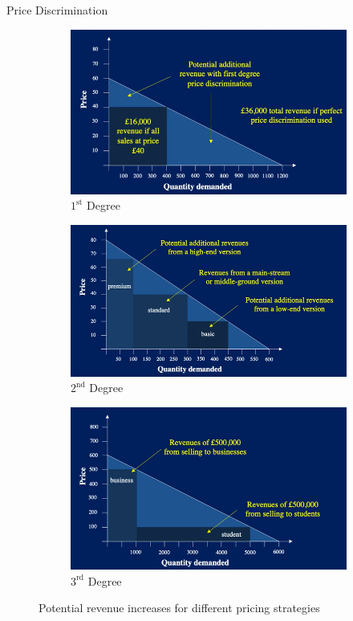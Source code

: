 \documentclass[11pt,a4paper]{article}
\begin{document}
\begin{definition}{Price Discrimination}
  \begin{figure}[ht!]
    \centering
    \begin{subfigure}[b]{.3\textwidth}
         \centering
         \includegraphics[width=\textwidth]{personalisedPricing.PNG}
         \caption{$1^\text{st}$ Degree}
    \end{subfigure}
    \begin{subfigure}[b]{.3\textwidth}
        \centering
        \includegraphics[width=\textwidth]{versioningPricing.PNG}
        \caption{$2^\text{nd}$ Degree}
    \end{subfigure}
    \begin{subfigure}[b]{.3\textwidth}
         \centering
         \includegraphics[width=\textwidth]{groupPricing.PNG}
         \caption{$3^\text{rd}$ Degree}
     \end{subfigure}
    \caption{Potential revenue increases for different pricing strategies}
  \end{figure}

\end{definition}
\end{document}
